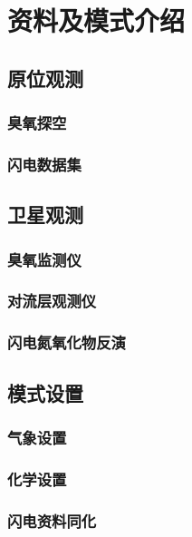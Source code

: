 \chapter{资料及模式介绍}

\section{原位观测}

\subsection{臭氧探空}
\subsection{闪电数据集}

\section{卫星观测}

\subsection{臭氧监测仪}
\subsection{对流层观测仪}
\subsection{闪电氮氧化物反演}

\section{模式设置}

\subsection{气象设置}
\subsection{化学设置}
\subsection{闪电资料同化}


